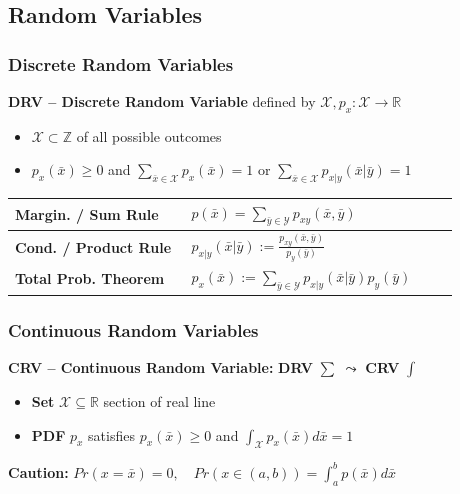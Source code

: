 \subsection{Random Variables}
    \subsubsection{Discrete Random Variables}
        \textbf{DRV -- Discrete Random Variable} defined by $\mathcal{X}, p_x: \mathcal{X} \to \mathbb{R}$
        \begin{itemize}[left=0pt, itemsep=-5pt]
            \item $\mathcal{X} \subset \mathbb{Z}$ of all possible outcomes \\
            \item $p_x(\bar{x}) \geq 0$ and $\sum_{\bar{x}\in\mathcal{X}}p_x(\bar{x}) = 1$ or $\sum_{\bar{x}\in\mathcal{X}} p_{x|y}(\bar{x} | \bar{y}) = 1$
        \end{itemize}
        \begin{tabular}{p{0.35\linewidth} | p{0.53\linewidth}}
            \toprule
            \textbf{Margin. / Sum Rule} & $p(\bar{x}) = \textstyle\sum_{\bar{y}\in\mathcal{Y}}p_{xy}(\bar{x},\bar{y})$ \\
            \midrule
            \textbf{Cond. / Product Rule} & $p_{x|y}(\bar{x}|\bar{y}) := \frac{p_{xy}(\bar{x},\bar{y})}{p_{y}(\bar{y})}$ \\
            \midrule
            \textbf{Total Prob. Theorem} & $p_{x}(\bar{x}) := \textstyle\sum_{\bar{y}\in\mathcal{Y}} p_{x|y}(\bar{x}|\bar{y})p_y(\bar{y})$ \\
            \bottomrule
        \end{tabular}



    \subsubsection{Continuous Random Variables}
        \textbf{CRV -- Continuous Random Variable:} \textbf{DRV} $\sum$ $\leadsto$ \textbf{CRV} $\int$
        \begin{itemize} [itemsep=-3pt]
            \item \textbf{Set} $\mathcal{X} \subseteq \mathbb{R}$ section of real line \\
            \item \textbf{PDF} $p_x$ satisfies $p_x(\bar{x}) \geq 0$ and $\int_{\mathcal{X}}p_x(\bar{x}) d \bar{x} = 1$
        \end{itemize}
        \textbf{Caution:} $ Pr(x = \bar{x}) = 0, \quad Pr(x \in (a, b)) = \int_a^b p(\bar{x}) d\bar{x} $

